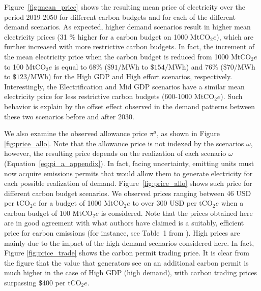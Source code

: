 \documentclass[11pt, letterpaper]{article}
\begin{document}
\smallskip
Figure~\ref{fig:mean_price} shows the resulting mean price of electricity over the period 2019-2050 for different carbon budgets and for each of the different demand scenarios. As expected, higher demand scenarios result in higher mean electricity prices (31 \% higher for a carbon budget on 1000 MtCO$_2e$), which are further increased with more restrictive carbon budgets. In fact, the increment of the mean electricity price when the carbon budget is reduced from 1000 MtCO$_2e$ to 100 MtCO$_2e$ is equal to 68\% ($\$91/$MWh to $\$154/$MWh) and 76\% (\$70$/$MWh to $\$123/$MWh) for the High GDP and High effort scenarios, respectively. Interestingly, the Electrification and Mid GDP scenarios have a similar mean electricity price for less restrictive carbon budgets (600-1000 MtCO$_2e$). Such behavior is explain by the offset effect observed in the demand patterns between these two scenarios before and after 2030.

\smallskip

We also examine the observed allowance price $\pi^a$, as shown in Figure \ref{fig:price_allo}. Note that the allowance price is not indexed by the scenarios $\omega$, however, the resulting price depends on the realization of each scenario $\omega$ (Equation~\ref{eq:pi_a_appendix}). In fact, facing uncertainty, emitting units must now acquire emissions permits that would allow them to generate electricity for each possible realization of demand.  Figure~\ref{fig:price_allo} shows such price for different carbon budget scenarios. We observed prices ranging between 46 USD per tCO$_2e$ for a budget of 1000 MtCO$_2e$ to over 300 USD per tCO$_2e$ when a carbon budget of 100 MtCO$_2e$ is considered. Note that the prices obtained here are in good agreement with what authors have claimed is a suitably, efficient price for carbon emissions (for instance, see Table~1 from \cite{feijoo2019climate}). High prices are mainly due to the impact of the high demand scenarios considered here. In fact, Figure \ref{fig:price_trade} shows the carbon permit trading price. It is clear from the figure that the value that generators see on an additional carbon permit is much higher in the case of High GDP (high demand), with carbon trading prices surpassing \$400 per tCO$_2e$.  
\smallskip

\end{document}
